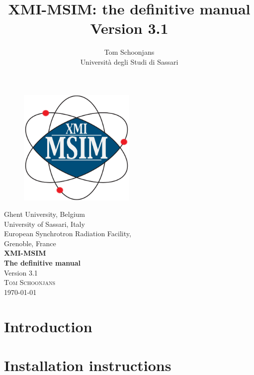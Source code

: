 \documentclass[11pt,a4paper,oneside,titlepage]{article}
\title{XMI-MSIM: the definitive manual\\\small{Version 3.1}}
\author{Tom Schoonjans\\Universit\`a degli Studi di Sassari}
\begin{document}
\begin{titlepage}
\begin{center}
\begin{figure}
\begin{center}
\includegraphics[width=0.5\textwidth]{Logo_xmi_msim.png}
\end{center}
\end{figure}
\vspace{1cm}
\Large{Ghent University, Belgium\\}
\vspace{0.7cm}
\Large{University of Sassari, Italy\\}
\vspace{0.7cm}
\Large{European Synchrotron Radiation Facility,\\Grenoble, France\\}
\vspace{1.5cm}
\Huge{\bfseries{XMI-MSIM\\}}
\vspace{1.5cm}
\huge{\bfseries{The definitive manual\\}}
\vspace{1.5cm}
\Large{Version 3.1\\}
\vspace{1.5cm}
\textsc{\large{Tom Schoonjans\\}}
\vfill
{\large \today}
\end{center}
\end{titlepage}


\tableofcontents
\newpage

\section{Introduction}\label{introduction}


\section{Installation instructions}\label{Installation-instructions}

\end{document}
